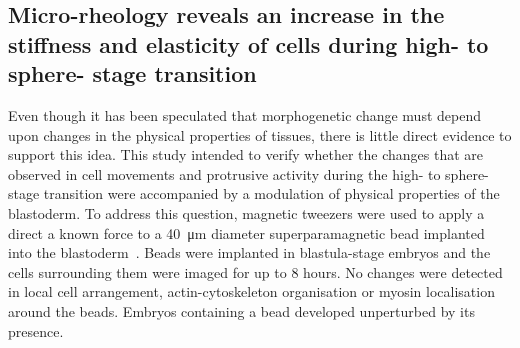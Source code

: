 \subsection{Micro-rheology reveals an increase in the stiffness and elasticity of cells during high- to sphere- stage transition}

Even though it has been speculated that morphogenetic change must depend upon changes in the physical properties of tissues, there is little direct evidence to support this idea.
This study intended to verify whether the changes that are observed in cell movements and protrusive activity during the high- to sphere-stage transition were accompanied by a modulation of physical properties of the blastoderm.
To address this question, magnetic tweezers were used to apply a direct a known force to a \SI{40}{\micro\meter} diameter superparamagnetic bead implanted into the blastoderm~\cite{20}. %
Beads were implanted in blastula-stage embryos and the cells surrounding them were imaged for up to 8 hours.
No changes were detected in local cell arrangement, actin-cytoskeleton organisation or myosin localisation around the beads.
Embryos containing a bead developed unperturbed by its presence.

